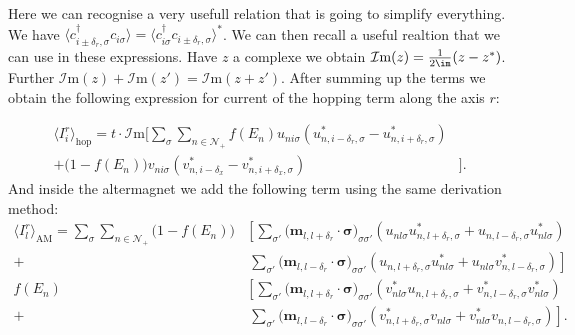 \documentclass[../main.tex]{subfile}
\begin{document}
Here we can recognise a very usefull relation that is going to simplify everything. We have $\langle c_{i\pm\delta_r,\sigma}^{\dagger} c_{i\sigma}\rangle = \langle c_{i\sigma}^{\dagger}c_{i\pm\delta_{r},\sigma} \rangle^{\ast}$.
We can then recall a useful realtion that we can use in these expressions. Have $z$ a complexe we obtain $\mathcal{I}\text{m}(z) = \frac{1}{2\im}(z-z^{\ast})$. Further $\mathcal{I}\text{m}(z)+\mathcal{I}\text{m}(z') = \mathcal{I}\text{m}(z+z')$.
After summing up the terms we obtain the following expression for current of the hopping term along the axis $r$:

\begin{equation}
    \begin{aligned}
        \langle I_i^r\rangle_{\text{hop}} = t\cdot\mathcal{I}\text{m}\biggl[ \sum_{\sigma}\sum_{n\in\mathcal{N}_+} 
            f(E_n)u_{ni\sigma}\left(u_{n,i-\delta_r,\sigma}^{\ast} - u_{n,i+\delta_r,\sigma}^{\ast}\right) &\\
            +\bigl(1-f(E_n)\bigr) v_{ni\sigma}\left(v_{n,i-\delta_x}^{\ast} - v_{n,i+\delta_x,\sigma}^{\ast}\right)&\biggr].
    \end{aligned}
\end{equation}
And inside the altermagnet we add the following term using the same derivation method:
\begin{equation*}
    \begin{aligned}
    \langle I_l^r\rangle_{\text{AM}} = \sum_{\sigma}\sum_{n\in\mathcal{N}_+} \bigl(1-f(E_n)) 
    &\left[ \sum _{\sigma'}\bigl(\bm{m}_{l,l+\delta_r}\cdot\bm{\sigma}\bigr)_{\sigma\sigma'} \left(u_{nl\sigma} u_{n,l+\delta_r,\sigma}^{\ast}  + u_{n,l-\delta_r,\sigma}u_{nl\sigma}^{\ast}\right)\right.\\
    +&~\left.\sum _{\sigma'}\bigl(\bm{m}_{l,l-\delta_r}\cdot\bm{\sigma}\bigr)_{\sigma\sigma'} \left(u_{n,l+\delta_r,\sigma} u_{nl\sigma}^{\ast} + u_{nl\sigma}v_{n,l-\delta_r,\sigma}^{\ast}\right)\right]\\
    f(E_n)&\left[ \sum _{\sigma'}\bigl(\bm{m}_{l,l+\delta_r}\cdot\bm{\sigma}\bigr)_{\sigma\sigma'} \left(v_{nl\sigma}^{\ast} u_{n,l+\delta_r,\sigma}  + v_{n,l-\delta_r,\sigma}^{\ast}v_{nl\sigma}^{\ast}\right)\right.\\
    +&~\left.\sum _{\sigma'}\bigl(\bm{m}_{l,l-\delta_r}\cdot\bm{\sigma}\bigr)_{\sigma\sigma'} \left(v_{n,l+\delta_r,\sigma}^{\ast} v_{nl\sigma} + v_{nl\sigma}^{\ast}v_{n,l-\delta_r,\sigma}\right)\right].
    \end{aligned}
\end{equation*}
\end{document}
